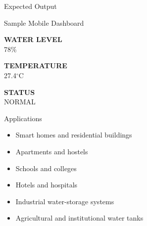 \documentclass[aspectratio=169]{beamer}
\begin{document}

\begin{frame}{Expected Output}

\begin{center}

\begin{block}{Sample Mobile Dashboard}

\Large
\textbf{WATER LEVEL}\\
78\%

\vspace{0.3cm}

\textbf{TEMPERATURE}\\
27.4$^\circ$C

\vspace{0.3cm}

\textbf{STATUS}\\
NORMAL

\end{block}

\end{center}

\end{frame}


\begin{frame}{Applications}

\begin{itemize}

    \item Smart homes and residential buildings

    \item Apartments and hostels

    \item Schools and colleges

    \item Hotels and hospitals

    \item Industrial water-storage systems

    \item Agricultural and institutional water tanks

\end{itemize}

\end{frame}

\end{document}
